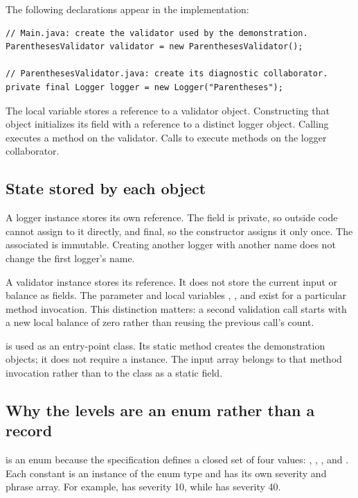 \begin{samepage}
The following declarations appear in the implementation:
\begin{lstlisting}
// Main.java: create the validator used by the demonstration.
ParenthesesValidator validator = new ParenthesesValidator();

// ParenthesesValidator.java: create its diagnostic collaborator.
private final Logger logger = new Logger("Parentheses");
\end{lstlisting}
\end{samepage}
The local variable  stores a reference to a validator object. Constructing that object initializes its  field with a reference to a distinct logger object. Calling  executes a method on the validator. Calls to  execute methods on the logger collaborator.

\subsection{State stored by each object}
A logger instance stores its own  reference. The field is private, so outside code cannot assign to it directly, and final, so the constructor assigns it only once. The associated  is immutable. Creating another logger with another name does not change the first logger's name.

A validator instance stores its  reference. It does not store the current input or balance as fields. The parameter  and local variables , , and  exist for a particular method invocation. This distinction matters: a second validation call starts with a new local balance of zero rather than reusing the previous call's count.

 is used as an entry-point class. Its static  method creates the demonstration objects; it does not require a  instance. The input array belongs to that method invocation rather than to the class as a static field.

\subsection{Why the levels are an enum rather than a record}
 is an enum because the specification defines a closed set of four values: , , , and . Each constant is an instance of the enum type and has its own severity and phrase array. For example,  has severity 10, while  has severity 40.

